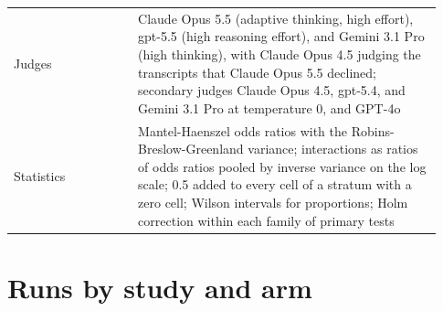 \documentclass[10pt]{article}
\begin{document}
\begin{table}[H]
\begin{tabular}{@{}p{0.27\linewidth}p{0.66\linewidth}@{}}
Judges & Claude Opus 5.5 (adaptive thinking, high effort), gpt-5.5 (high reasoning effort), and Gemini 3.1 Pro (high thinking), with Claude Opus 4.5 judging the transcripts that Claude Opus 5.5 declined; secondary judges Claude Opus 4.5, gpt-5.4, and Gemini 3.1 Pro at temperature 0, and GPT-4o \\
Statistics & Mantel-Haenszel odds ratios with the Robins-Breslow-Greenland variance; interactions as ratios of odds ratios pooled by inverse variance on the log scale; 0.5 added to every cell of a stratum with a zero cell; Wilson intervals for proportions; Holm correction within each family of primary tests \\
\bottomrule
\end{tabular}
\end{table}

\section{Runs by study and arm}
\label{app:runs}
\end{document}

